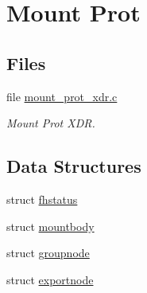 \hypertarget{group__libfs__nfsclient__mount__prot}{}\section{Mount Prot}
\label{group__libfs__nfsclient__mount__prot}
\subsection*{Files}
\begin{DoxyCompactItemize}
\item 
file \mbox{\hyperlink{mount__prot__xdr_8c}{mount\+\_\+prot\+\_\+xdr.\+c}}
\begin{DoxyCompactList}\small\item\em Mount Prot X\+DR. \end{DoxyCompactList}\end{DoxyCompactItemize}
\subsection*{Data Structures}
\begin{DoxyCompactItemize}
\item 
struct \mbox{\hyperlink{structfhstatus}{fhstatus}}
\item 
struct \mbox{\hyperlink{structmountbody}{mountbody}}
\item 
struct \mbox{\hyperlink{structgroupnode}{groupnode}}
\item 
struct \mbox{\hyperlink{structexportnode}{exportnode}}
\end{DoxyCompactItemize}
